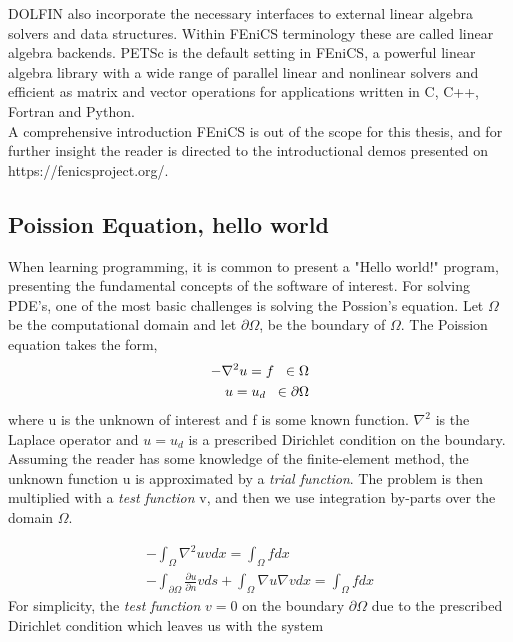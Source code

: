 DOLFIN also incorporate the necessary interfaces to external linear algebra solvers and data structures. Within FEniCS terminology these are called linear algebra backends. PETSc is the default setting in FEniCS, a powerful linear algebra library
with a wide range of parallel linear and nonlinear solvers and efficient as matrix and vector operations for applications written in C, C++, Fortran and Python. \\
A comprehensive introduction FEniCS is out of the scope for this thesis, and for further insight the reader is directed to the introductional demos presented on https://fenicsproject.org/.  \\

\subsection{Poission Equation, hello world}
When learning programming, it is common to present a "Hello world!" program, presenting the fundamental concepts of the software of interest. For solving PDE's, one of the most basic challenges is solving the Possion's equation. Let $\Omega$ be the computational domain  and let $\partial \Omega$, be the boundary of $\Omega$. The Poission equation takes the form,
\begin{align*}
- \nabla^2 u = f \hspace{2mm} \in \Omega \\
u = u_d \hspace{2mm} \in \partial \Omega
\end{align*}
where u is the unknown of interest and f is some known function. $\nabla^2$ is the Laplace operator and $u = u_d$ is a prescribed Dirichlet condition on the boundary. 
Assuming the reader has some knowledge of the finite-element method, the unknown function u is approximated by a \textit{trial function}. The problem is then multiplied with a \textit{test function} v, and then we use integration by-parts over the domain $\Omega$. 

\begin{align*}
-\int_{\Omega} \nabla^2 u v dx = \int_{\Omega} f dx \\
- \int_{\partial \Omega} \frac{\partial u}{\partial n} v ds +
\int_{\Omega} \nabla u \nabla v dx = \int_{\Omega} f dx
\end{align*}
For simplicity, the \textit{test function} $v = 0$ on the boundary $\partial \Omega$ due to the prescribed Dirichlet condition which leaves us with the system

